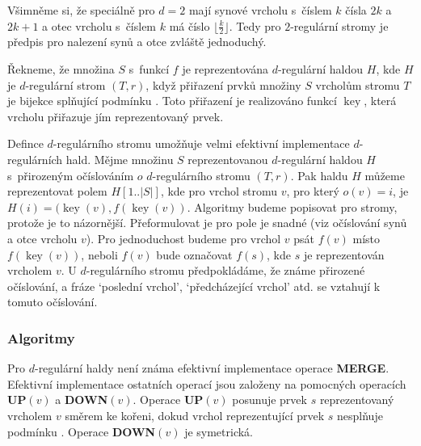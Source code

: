 \documentclass[a4paper,12pt]{article}
\DeclareMathOperator*{\key}{key}
\begin{document}
Všimněme si, že speciálně pro $d=2$ mají synové vrcholu s~číslem $
k$ 
čísla $2k$ a $2k+1$ a otec vrcholu s~číslem $k$ má číslo 
$\lfloor\frac k2\rfloor$. Tedy pro $2$-regulární stromy je předpis pro nalezení 
synů a otce zvláště jednoduchý.  

Řekneme, že množina $S$ s~funkcí $f$ je reprezentována 
$d$-regulár\-ní haldou $H$, kde $H$ je $d$-regulární strom $
(T,r)$, když 
přiřazení prvků množiny $S$ vrcholům stromu 
$T$ je bijekce splňující podmínku . Toto přiřazení 
je realizováno funkcí $\key$, která vrcholu přiřazuje jím 
reprezentovaný prvek.

Defince $d$-regulárního stromu umožňuje velmi efektivní 
implementace $d$-regulárních hald.  Měj\-me množinu $
S$ 
reprezentovanou $d$-regulární haldou $H$ s~přirozeným 
očís\-lo\-vá\-ním $o$ $d$-regulární\-ho stromu $
(T,r)$.  Pak haldu $H$ 
můžeme reprezentovat polem $H[1..|S|]$, kde pro vrchol 
stromu $v$, pro který $o(v)=i$, je $H(i)=(\key(v),f(\key(v))$.  Algoritmy 
budeme popisovat pro stromy, protože je to názornější.  
Přeformulovat je pro pole je snadné (viz 
očíslování synů a otce vrcholu $v$).  Pro jednoduchost 
budeme pro vrchol $v$ psát $f(v)$ místo $f(\key(v))$, neboli $
f(v)$ 
bude označovat $f(s)$, kde $s$ je reprezentován vrcholem $v$.  U 
$d$-regulárního stromu předpo\-klá\-dáme, že známe přirozené 
očíslování, a fráze `poslední vrchol', `před\-cházející vrchol' atd.  
se vztahují k tomuto očíslování.  

\subsubsection{Algoritmy}

Pro $d$-regulární haldy není známa efektivní implementace operace 
{\bf MERGE}.  Efektivní implementace 
ostatních operací jsou založeny na pomocných 
operacích {\bf UP$(v)$} a {\bf DOWN$(v)$}.  Ope\-race {\bf UP$
(v)$} posunuje 
prvek $s$ reprezentovaný vrcholem $v$ směrem ke kořeni, 
dokud vrchol reprezentující prvek $s$ nesplňu\-je podmínku 
.  Operace {\bf DOWN$(v)$} je symetrická.  
\end{document}
